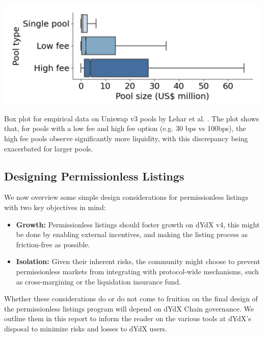             \begin{marginfigure}
                \centering
                \includegraphics[width=\linewidth]{figs/sizes.png}
                \captionsetup{width=\linewidth}
                \caption{Box plot for empirical data on Uniswap v3 pools by Lehar et al. \cite{lehar2023liquidity}. The plot shows that, for pools with a low fee and high fee option (e.g. 30 bps vs 100bps), the high fee pools observe significantly more liquidity, with this discrepancy being exacerbated for larger pools.}
            \end{marginfigure}


        \subsection{Designing Permissionless Listings}

            We now overview some simple design considerations for permissionless listings with two key objectives in mind:

            \begin{itemize}
                \item \textbf{Growth:} Permissionless listings should foster growth on dYdX v4, this might be done by enabling external incentives, and making the listing process as friction-free as possible.
                \item \textbf{Isolation:} Given their inherent risks, the community might choose to prevent permissionless markets from integrating with protocol-wide mechanisms, such as cross-margining or the liquidation insurance fund.
            \end{itemize}
            
            Whether these considerations do or do not come to fruition on the final design of the permissionless listings program will depend on dYdX Chain governance. We outline them in this report to inform the reader on the various tools at dYdX's disposal to minimize risks and losses to dYdX users.
            
